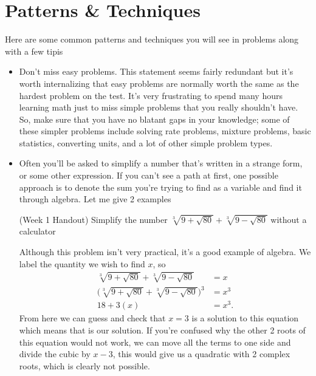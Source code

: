 \documentclass[11pt]{article}
\begin{document}
\section{Patterns \& Techniques}
Here are some common patterns and techniques you will see in problems along with a few tipis
\begin{itemize}
\item Don't miss easy problems. This statement seems fairly redundant but it's worth internalizing that easy problems are normally worth the same as the hardest problem on the test. It's very frustrating to spend many hours learning 
math just to miss simple problems that you really shouldn't have. So, make sure that you have no blatant gaps in your knowledge; some of these simpler problems include solving rate problems, mixture problems, basic statistics, converting units, and a
 lot of other simple problem types.
\item Often you'll be asked to simplify a number that's written in a strange form, or some other expression. If you can't see a path at first, one possible approach is to denote the sum you're trying to find as a variable and find it through algebra. Let me give 2 examples
    \begin{example}{(Week 1 Handout)}
         Simplify the number $\sqrt[3]{9+\sqrt{80}}+\sqrt[3]{9-\sqrt{80}}$ without a calculator
    \end{example}
    Although this problem isn't very practical, it's a good example of algebra. We label the quantity we wish to find $x$, so
    \begin{equation*}
        \begin{aligned}
            \sqrt[3]{9+\sqrt{80}}+\sqrt[3]{9-\sqrt{80}} & = x \\
            \bigg(\sqrt[3]{9+\sqrt{80}}+\sqrt[3]{9-\sqrt{80}} \bigg)^3 & = x^3 \\
            18 + 3(x)  & = x^3. 
        \end{aligned}
    \end{equation*}
    From here we can guess and check that $x=3$ is a solution to this equation which means that is our solution. If you're confused why the other 2 roots of this equation would not work, we can move all the terms to one side and divide the cubic by $x-3$, this would give us a quadratic with 2 complex roots, which is clearly not possible.


\end{itemize}
\end{document}

